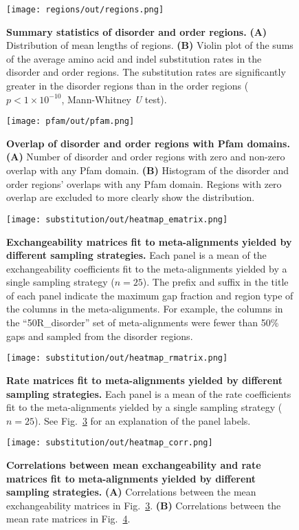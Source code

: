 \begin{figure}[h!]
\texttt{[image: regions/out/regions.png]}
\centering
\caption{\textbf{Summary statistics of disorder and order regions.}
\textbf{(A)} Distribution of mean lengths of regions. \textbf{(B)} Violin plot of the sums of the average amino acid and indel substitution rates in the disorder and order regions. The substitution rates are significantly greater in the disorder regions than in the order regions ($p < 1 \times 10^{-10}$, Mann-Whitney \textit{U} test).}
\label{sfig:regions}
\end{figure}

\begin{figure}[h!]
\texttt{[image: pfam/out/pfam.png]}
\centering
\caption{\textbf{Overlap of disorder and order regions with Pfam domains.}
\textbf{(A)} Number of disorder and order regions with zero and non-zero overlap with any Pfam domain. \textbf{(B)} Histogram of the disorder and order regions' overlaps with any Pfam domain. Regions with zero overlap are excluded to more clearly show the distribution.}
\label{sfig:pfam}
\end{figure}

\begin{figure}[h!]
\texttt{[image: substitution/out/heatmap\_ematrix.png]}
\centering
\caption{\textbf{Exchangeability matrices fit to meta-alignments yielded by different sampling strategies.}
Each panel is a mean of the exchangeability coefficients fit to the meta-alignments yielded by a single sampling strategy ($n = 25$). The prefix and suffix in the title of each panel indicate the maximum gap fraction and region type of the columns in the meta-alignments. For example, the columns in the ``50R\_disorder'' set of meta-alignments were fewer than 50\% gaps and sampled from the disorder regions.}
\label{sfig:heatmap_ematrix}
\end{figure}

\begin{figure}[h!]
\texttt{[image: substitution/out/heatmap\_rmatrix.png]}
\centering
\caption{\textbf{Rate matrices fit to meta-alignments yielded by different sampling strategies.}
Each panel is a mean of the rate coefficients fit to the meta-alignments yielded by a single sampling strategy ($n = 25$). See Fig.~\ref{sfig:heatmap_ematrix} for an explanation of the panel labels.}
\label{sfig:heatmap_rmatrix}
\end{figure}

\begin{figure}[h!]
\texttt{[image: substitution/out/heatmap\_corr.png]}
\centering
\caption{\textbf{Correlations between mean exchangeability and rate matrices fit to meta-alignments yielded by different sampling strategies.}
\textbf{(A)} Correlations between the mean exchangeability matrices in Fig.~\ref{sfig:heatmap_ematrix}. \textbf{(B)} Correlations between the mean rate matrices in Fig.~\ref{sfig:heatmap_rmatrix}.}
\label{sfig:heatmap_corr}
\end{figure}

